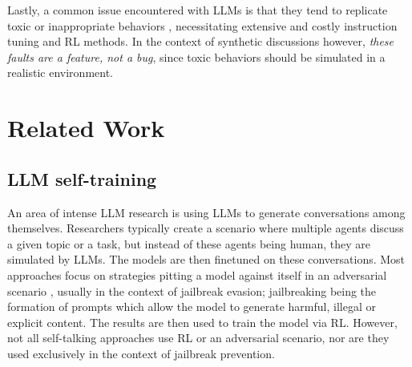 Lastly, a common issue encountered with LLMs is that they tend to replicate toxic or inappropriate behaviors \cite{Birkun_Gautam_2023}, necessitating extensive and costly instruction tuning and \ac{RL} methods. In the context of synthetic discussions however, \textit{these faults are a feature, not a bug}, since toxic behaviors should be simulated in a realistic environment.

\section{Related Work}
\label{sec:related:sec2}

\subsection{LLM self-training}
\label{sec:related:self-train}

An area of intense LLM research is using LLMs to generate conversations among themselves. Researchers typically create a scenario where multiple agents discuss a given topic or a task, but instead of these agents being human, they are simulated by LLMs. The models are then finetuned on these conversations. Most approaches focus on strategies pitting a model against itself in an adversarial scenario \cite{liu2024largelanguagemodelsagents, cheng2024selfplayingadversariallanguagegame, zheng2024optimalllmalignmentsusing}, usually in the context of jailbreak evasion; jailbreaking being the formation of prompts which allow the model to generate harmful, illegal or explicit content. The results are then used to train the model via \ac{RL}. However, not all self-talking approaches use \ac{RL} or an adversarial scenario, nor are they used exclusively in the context of jailbreak prevention.

